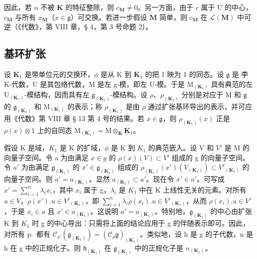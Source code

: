 因此，若 \(n\) 不被 \(\mathbf{K}\) 的特征整除，则 \(c_{\mathbf{M}} \neq 0\)。另一方面，由于 \(c\) 属于 \(\mathrm{U}\) 的中心，\(c_{\mathbf{M}}\) 与所有 \(x_{\mathbf{M}}\)（\(x \in \mathfrak{g}\)）可交换。若进一步假设 \(\mathbf{M}\) 简单，则 \(c_{\mathbf{M}}\) 在 \(\mathcal{L}(\mathbf{M})\) 中可逆（《代数》，第 VIII 章，§ 4，第 3 号命题 2）。

\subsection{基环扩张}

设 \(\mathbf{K}_1\) 是带单位元的交换环，\(\phi\) 是从 K 到 \(\mathbf{K}_1\) 的把 1 映为 1 的同态。设 \(\mathfrak{g}\) 是 李 K-代数，U 是其包络代数，M 是左 g-模，即左 U-模。于是 \(\mathrm{M}_{(\mathbf{K}_1)}\) 具有典范的左 \(\mathrm{U}_{(\mathbf{K}_1)}\)-模结构，因而具有左 \(\mathfrak{g}_{(\mathbf{K}_1)}\)-模结构。设 \(\rho\)、\(\rho_{(\mathbf{K}_1)}\) 分别是对应于 M 和 \(\mathfrak{g}\) 的 \(\mathfrak{g}_{(\mathbf{K}_1)}\) 和 \(\mathrm{M}_{(\mathbf{K}_1)}\) 的表示；称 \(\rho_{(\mathbf{K}_1)}\) 是由 \(\rho\) 通过扩张基环导出的表示，并可应用《代数》第 VIII 章 § 13 第 4 号的结果。若 \(x \in \mathfrak{g}\)，则 \(\rho_{(\mathbf{K}_1)}(x)\) 正是 \(\rho(x) \otimes 1\) 上的自同态 \(\mathrm{M}_{(\mathbf{K}_1)} = \mathrm{M} \otimes_{\mathbf{K}} \mathbf{K}_1\)。

假设 K 是域，\(K_{1}\) 是 K 的扩域，\(\phi\) 是 K 到 \(K_{1}\) 的典范嵌入。设 V 和 \(V'\) 是 M 的向量子空间。令 a 为由满足 \(x \in g\) 的 \(\rho(x)(V) \subset V'\) 组成的 g 的向量子空间。令 \(a'\) 为由满足 \(\mathfrak{g}_{(\mathbf{K}_{1})}\) 的 \(x' \in \mathfrak{g}_{(\mathbf{K}_{1})}\) 组成的 \(\rho_{(\mathbf{K}_{1})}(x')(V_{(\mathbf{K}_{1})}) \subset V'_{(\mathbf{K}_{1})}\) 的向量子空间。则 \(a' = a_{(\mathbf{K}_{1})}\)。显然 \(a_{(\mathbf{K}_{1})} \subset a'\)。现在令 \(x' \in a'\)。可写成 \(x' = \sum_{i=1}^{n} \lambda_{i} x_{i}\)，其中 \(x_{i}\) 属于 g，\(\lambda_{i}\) 是 \(K_{1}\) 中在 K 上线性无关的元素。对所有 \(u \in V\)，\(\rho(x') .u \in V'_{(\mathbf{K}_{1})}\)，即 \(\sum_{i=1}^{n} \lambda_{i} \rho(x_{i}) .u \in V'_{(\mathbf{K}_{1})}\)，从而 \(\rho(x_{i}) .u \in V'\)，于是 \(x_{i} \in a\) 且 \(x' \in a_{(\mathbf{K}_{1})}\)。这说明 \(a' = a_{(\mathbf{K}_{1})}\)。特别地，\(\mathfrak{g}_{(\mathbf{K}_{1})}\) 的中心由扩张 K 到 \(K_{1}\) 时 g 的中心导出：只需将上面的结论应用于 g 的伴随表示即可。因此，对所有 p.~都有 \(\mathcal{C}_{\rho'}(\mathfrak{g}_{(\mathbf{K}_{1})}) = (\mathcal{C}_{\rho}\mathfrak{g})_{(\mathbf{K}_{1})}\)。类似地，设 h 是 g 的子代数，n 是 h 在 g 中的正规化子。则 \(\mathfrak{h}_{(\mathbf{K}_{1})}\) 在 \(\mathfrak{g}_{(\mathbf{K}_{1})}\) 中的正规化子是 \(n_{(\mathbf{K}_{1})}\)。

